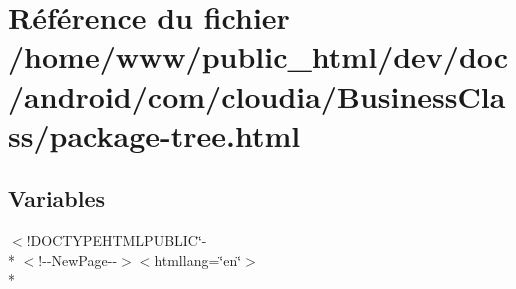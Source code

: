 \hypertarget{com_2cloudia_2_business_class_2package-tree_8html}{\section{Référence du fichier /home/www/public\-\_\-html/dev/doc/android/com/cloudia/\-Business\-Class/package-\/tree.html}
\label{com_2cloudia_2_business_class_2package-tree_8html}
}
\subsection*{Variables}
\begin{DoxyCompactItemize}
\item 
$<$!D\-O\-C\-T\-Y\-P\-E\-H\-T\-M\-L\-P\-U\-B\-L\-I\-C\char`\"{}-\/\\*
$<$!-\/-\/New\-Page-\/-\/$>$$<$htmllang=\char`\"{}en\char`\"{}$>$\\*
$$
\end{DoxyCompactItemize}

